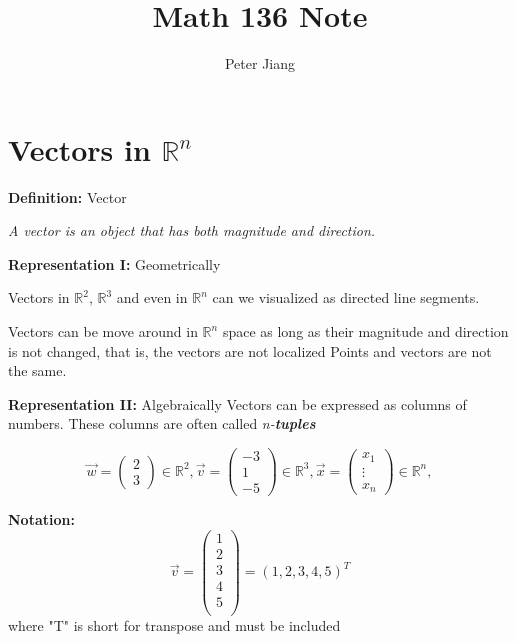 \documentclass{article}
\title{Math 136 Note}
\author{Peter Jiang}
\begin{document}
\maketitle

\newpage

\section{Vectors in $\mathbb{R}^n$ }

\textbf{Definition:} Vector

\begin{tcolorbox}
\emph{A vector is an object that has both magnitude and direction.}
\end{tcolorbox}

\textbf{Representation I:} Geometrically


Vectors in $\mathbb{R}^2$, $\mathbb{R}^3$ and even in $\mathbb{R}^n$
can we visualized as directed line segments.

Vectors can be move around in $\mathbb{R}^n$ space as long as their magnitude
and direction is not changed, that is, the vectors are not localized
Points and vectors are not the same.

\medskip

\textbf{Representation II:} Algebraically
Vectors can be expressed as columns of numbers. These columns are often called \emph{n-\textbf{tuples}}

\[
    \vec{w} = 
    \begin{pmatrix} 
        2 \\
        3
    \end{pmatrix} \in \mathbb{R} ^ 2,
    \vec{v} = 
    \begin{pmatrix} 
        -3 \\
        1 \\
        -5
    \end{pmatrix} \in \mathbb{R} ^3,
    \vec{x} = 
    \begin{pmatrix} 
        x_1 \\
        \vdots \\
        x_n
    \end{pmatrix} \in \mathbb{R} ^ n,
\]

\medskip

\textbf{Notation:}
\[
    \vec{v} = \begin{pmatrix}
        1 \\
        2 \\
        3 \\
        4 \\
        5 \\

    \end{pmatrix} = (1, 2, 3, 4, 5)^T
\]
where "T" is short for transpose and must be included
\end{document}
